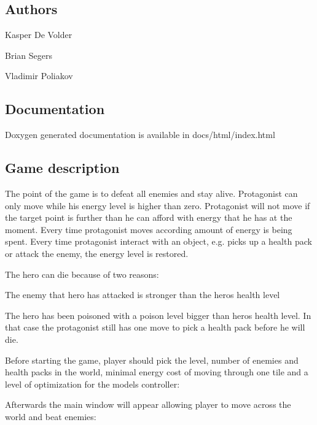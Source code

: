 \subsection*{Authors}


\begin{DoxyItemize}
\item Kasper De Volder
\item Brian Segers
\item Vladimir Poliakov
\end{DoxyItemize}

\subsection*{Documentation}

Doxygen generated documentation is available in docs/html/index.\+html

\subsection*{Game description}

The point of the game is to defeat all enemies and stay alive. Protagonist can only move while his energy level is higher than zero. Protagonist will not move if the target point is further than he can afford with energy that he has at the moment. Every time protagonist moves according amount of energy is being spent. Every time protagonist interact with an object, e.\+g. picks up a health pack or attack the enemy, the energy level is restored.

The hero can die because of two reasons\+:
\begin{DoxyItemize}
\item The enemy that hero has attacked is stronger than the hero\textquotesingle{}s health level
\item The hero has been poisoned with a poison level bigger than hero\textquotesingle{}s health level. In that case the protagonist still has one move to pick a health pack before he will die.
\end{DoxyItemize}

Before starting the game, player should pick the level, number of enemies and health packs in the world, minimal energy cost of moving through one tile and a level of optimization for the model\textquotesingle{}s controller\+:



Afterwards the main window will appear allowing player to move across the world and beat enemies\+:



